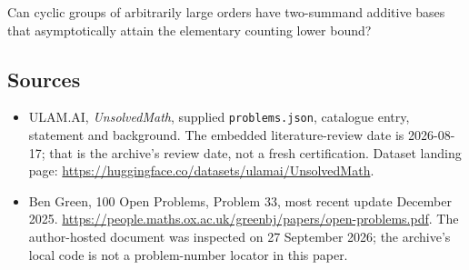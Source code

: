 \documentclass[11pt,a4paper]{article}
\begin{document}
Can cyclic groups of arbitrarily large orders have two-summand additive bases that asymptotically attain the elementary counting lower bound?

\subsection{Sources}

{\small

\begin{itemize}

\item[\hypertarget{source:statement:1}{S1}] ULAM.AI, \emph{UnsolvedMath}, supplied \texttt{problems.json}, catalogue entry, statement and background. The embedded literature-review date is 2026-08-17; that is the archive’s review date, not a fresh certification. Dataset landing page: \url{https://huggingface.co/datasets/ulamai/UnsolvedMath}.

\item[\hypertarget{source:statement:2}{S2}] Ben Green, 100 Open Problems, Problem 33, most recent update December 2025. \url{https://people.maths.ox.ac.uk/greenbj/papers/open-problems.pdf}. The author-hosted document was inspected on 27 September 2026; the archive’s local code is not a problem-number locator in this paper.

\end{itemize}

}

\label{end:statement}
\end{document}
